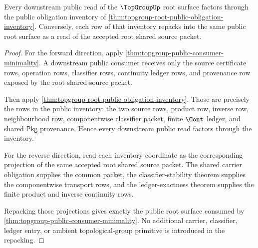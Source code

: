\begin{theorem}
\label{thm:topgroup-root-shared-source-exhaustion}
Every downstream public read of the $\TopGroupUp$ root surface factors through
the public obligation inventory of
\autoref{thm:topgroup-root-public-obligation-inventory}. Conversely, each row
of that inventory repacks into the same public root surface as a read of the
accepted root shared source packet.
\end{theorem}
\begin{proof}
For the forward direction, apply
\autoref{thm:topgroup-public-consumer-minimality}. A downstream public
consumer receives only the source certificate rows, operation rows,
classifier rows, continuity ledger rows, and provenance row exposed by the
root shared source packet.

Then apply
\autoref{thm:topgroup-root-public-obligation-inventory}. Those are precisely
the rows in the public inventory: the two source rows, product row, inverse
row, neighbourhood row, componentwise classifier packet, finite $\Cont$
ledger, and shared $\mathsf{Pkg}$ provenance. Hence every downstream public
read factors through the inventory.

For the reverse direction, read each inventory coordinate as the corresponding
projection of the same accepted root shared source packet. The shared carrier
obligation supplies the common packet, the classifier-stability theorem
supplies the componentwise transport rows, and the ledger-exactness theorem
supplies the finite product and inverse continuity rows.

Repacking those projections gives exactly the public root surface consumed by
\autoref{thm:topgroup-public-consumer-minimality}. No additional carrier,
classifier, ledger entry, or ambient topological-group primitive is introduced
in the repacking.
\end{proof}
